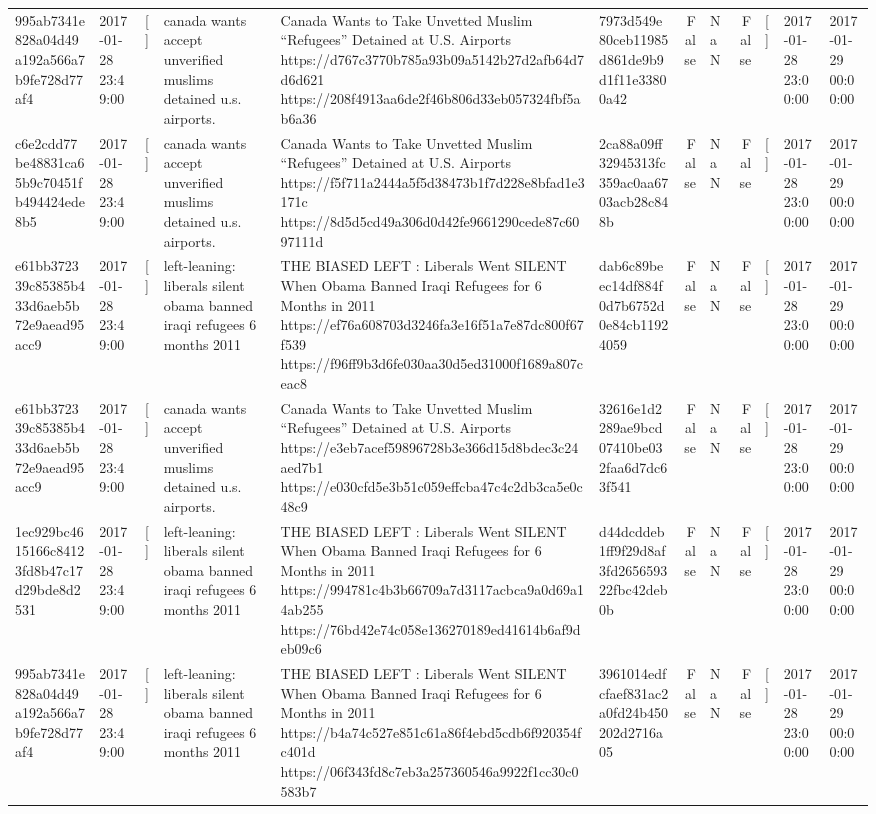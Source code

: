 \begin{tabular}{llllllrlrlll}
995ab7341e828a04d49a192a566a7b9fe728d77af4 & 2017-01-28 23:49:00 & [] & canada wants accept unverified muslims detained u.s. airports. & Canada Wants to Take Unvetted Muslim “Refugees” Detained at U.S. Airports https://d767c3770b785a93b09a5142b27d2afb64d7d6d621 https://208f4913aa6de2f46b806d33eb057324fbf5ab6a36 & 7973d549e80ceb11985d861de9b9d1f11e33800a42 & False & NaN & False & [] & 2017-01-28 23:00:00 & 2017-01-29 00:00:00 \\
c6e2cdd77be48831ca65b9c70451fb494424ede8b5 & 2017-01-28 23:49:00 & [] & canada wants accept unverified muslims detained u.s. airports. & Canada Wants to Take Unvetted Muslim “Refugees” Detained at U.S. Airports https://f5f711a2444a5f5d38473b1f7d228e8bfad1e3171c https://8d5d5cd49a306d0d42fe9661290cede87c6097111d & 2ca88a09ff32945313fc359ac0aa6703acb28c848b & False & NaN & False & [] & 2017-01-28 23:00:00 & 2017-01-29 00:00:00 \\
e61bb372339c85385b433d6aeb5b72e9aead95acc9 & 2017-01-28 23:49:00 & [] & left-leaning: liberals silent obama banned iraqi refugees 6 months 2011 & THE BIASED LEFT : Liberals Went SILENT When Obama Banned Iraqi Refugees for 6 Months in 2011 https://ef76a608703d3246fa3e16f51a7e87dc800f67f539 https://f96ff9b3d6fe030aa30d5ed31000f1689a807ceac8 & dab6c89beec14df884f0d7b6752d0e84cb11924059 & False & NaN & False & [] & 2017-01-28 23:00:00 & 2017-01-29 00:00:00 \\
e61bb372339c85385b433d6aeb5b72e9aead95acc9 & 2017-01-28 23:49:00 & [] & canada wants accept unverified muslims detained u.s. airports. & Canada Wants to Take Unvetted Muslim “Refugees” Detained at U.S. Airports https://e3eb7acef59896728b3e366d15d8bdec3c24aed7b1 https://e030cfd5e3b51c059effcba47c4c2db3ca5e0c48c9 & 32616e1d2289ae9bcd07410be032faa6d7dc63f541 & False & NaN & False & [] & 2017-01-28 23:00:00 & 2017-01-29 00:00:00 \\
1ec929bc4615166c84123fd8b47c17d29bde8d2531 & 2017-01-28 23:49:00 & [] & left-leaning: liberals silent obama banned iraqi refugees 6 months 2011 & THE BIASED LEFT : Liberals Went SILENT When Obama Banned Iraqi Refugees for 6 Months in 2011 https://994781c4b3b66709a7d3117acbca9a0d69a14ab255 https://76bd42e74c058e136270189ed41614b6af9deb09c6 & d44dcddeb1ff9f29d8af3fd265659322fbc42deb0b & False & NaN & False & [] & 2017-01-28 23:00:00 & 2017-01-29 00:00:00 \\
995ab7341e828a04d49a192a566a7b9fe728d77af4 & 2017-01-28 23:49:00 & [] & left-leaning: liberals silent obama banned iraqi refugees 6 months 2011 & THE BIASED LEFT : Liberals Went SILENT When Obama Banned Iraqi Refugees for 6 Months in 2011 https://b4a74c527e851c61a86f4ebd5cdb6f920354fc401d https://06f343fd8c7eb3a257360546a9922f1cc30c0583b7 & 3961014edfcfaef831ac2a0fd24b450202d2716a05 & False & NaN & False & [] & 2017-01-28 23:00:00 & 2017-01-29 00:00:00 \\

\end{tabular}
